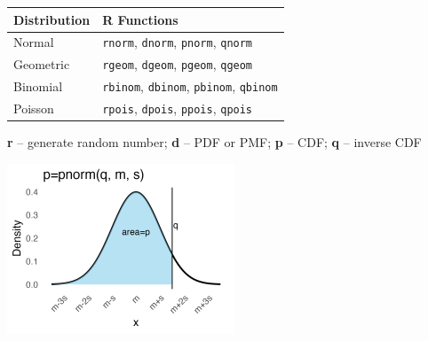 \documentclass[8pt]{article}
\begin{document}
\vspace{1em}

\begin{center}
\begin{minipage}[t]{0.6\textwidth}
\vspace{0pt} %
\renewcommand{\arraystretch}{1.3}
\begin{tabularx}{\textwidth}{|>{\raggedright\arraybackslash}X|>{\raggedright\arraybackslash}X|}
\hline
\textbf{Distribution} & \textbf{R Functions} \\
\hline
Normal & \texttt{rnorm}, \texttt{dnorm}, \texttt{pnorm}, \texttt{qnorm} \\
\hline
Geometric & \texttt{rgeom}, \texttt{dgeom}, \texttt{pgeom}, \texttt{qgeom} \\
\hline
Binomial & \texttt{rbinom}, \texttt{dbinom}, \texttt{pbinom}, \texttt{qbinom} \\
\hline
Poisson & \texttt{rpois}, \texttt{dpois}, \texttt{ppois}, \texttt{qpois} \\
\hline
\end{tabularx}

\vspace{0.5em}
\textbf{r} -- generate random number; \textbf{d} -- PDF or PMF; \textbf{p} -- CDF; \textbf{q} -- inverse CDF
\end{minipage}%
\hfill
\begin{minipage}[t]{0.4\textwidth}
\vspace{0pt} %
\centering
\includegraphics[height=2in]{pnorm_picture}
\end{minipage}
\end{center}
\end{document}

